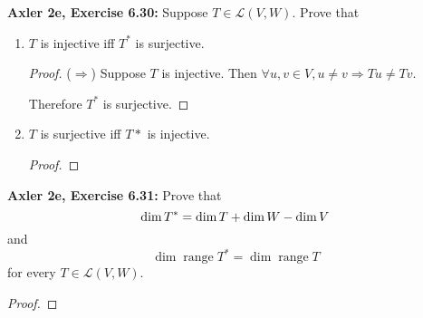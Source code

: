 \documentclass{article}
\DeclareMathOperator{\range}{range}
\begin{document}
\newpage %


\textbf{Axler 2e, Exercise 6.30: }
Suppose $T \in \mathcal{L}(V, W)$. Prove that

\begin{enumerate}
    \item 
    $T$ is injective iff $T^*$ is surjective.
    \begin{proof}
        ($\Longrightarrow$) Suppose $T$ is injective. Then $\forall u, v \in V, u \ne v \Rightarrow Tu \ne Tv$.

        Therefore $T^*$ is surjective.
    \end{proof}


    \item 
    $T$ is surjective iff $T*$ is injective.
    \begin{proof}
        
    \end{proof}
\end{enumerate}


\newpage %


\textbf{Axler 2e, Exercise 6.31: }
Prove that
$$\dim \null T^* = \dim \null T + \dim W - \dim V$$
and
$$\dim \range T^* = \dim \range T$$
for every $T \in \mathcal{L}(V, W)$.
\begin{proof}
    
\end{proof}
\end{document}
